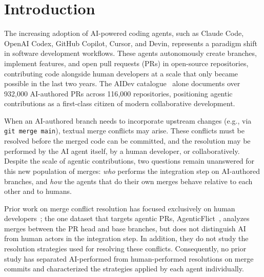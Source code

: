 \documentclass[sigconf,anonymous]{acmart}
\begin{document}

\frenchspacing
\maketitle

\section{Introduction}
\label{sec:introduction}

The increasing adoption of AI-powered coding agents, such as Claude Code, OpenAI Codex, GitHub Copilot, Cursor, and Devin, represents a paradigm shift in software development workflows. These agents autonomously create branches, implement features, and open pull requests (PRs) in open-source repositories, contributing code alongside human developers at a scale that only became possible in the last two years. The AIDev catalogue~\cite{liaidev2026} alone documents over 932{,}000 AI-authored PRs across 116{,}000 repositories, positioning agentic contributions as a first-class citizen of modern collaborative development.

When an AI-authored branch needs to incorporate upstream changes (e.g., via \texttt{git merge main}), textual merge conflicts may arise. These conflicts must be resolved before the merged code can be committed, and the resolution may be performed by the AI agent itself, by a human developer, or collaboratively. Despite the scale of agentic contributions, two questions remain unanswered for this new population of merges: \emph{who} performs the integration step on AI-authored branches, and \emph{how} the agents that do their own merges behave relative to each other and to humans.

Prior work on merge conflict resolution has focused exclusively on human developers~\cite{ghiotto2020nature,vale2022challenges,dinella2022deepmerge,svyatkovskiy2022mergebert,dong2023mergegen}; the one dataset that targets agentic PRs, AgenticFlict~\cite{agenticflict2025}, analyzes merges between the PR head and base branches, but does not distinguish AI from human actors in the integration step. In addition, they do not study the resolution strategies used for resolving these conflicts. Consequently, no prior study has separated AI-performed from human-performed resolutions on merge commits and characterized the strategies applied by each agent individually.
\end{document}
